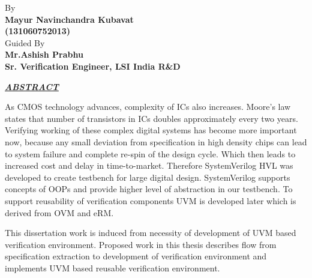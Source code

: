 \thispagestyle{plain}

\begin{center}
	\vspace{1cm}
		
		
	\vspace{1.5cm}
		
			\normalsize
			By\\
			\textbf{Mayur Navinchandra Kubavat}\\
			\textbf{(131060752013)} \\
			Guided By\\
			\textbf{Mr.Ashish Prabhu}\\
			\textbf{Sr. Verification Engineer, LSI India R\&D}
			
	\bigsize\textbf\textit\underline{ABSTRACT}
\end{center}

As CMOS technology advances, complexity of ICs also increases. Moore’s law states that number of transistors in ICs doubles approximately every two years. Verifying working of these complex digital systems has become more important now, because any small deviation from specification in high density chips can lead to system failure and complete re-spin of the design cycle. Which then leads to increased cost and delay in time-to-market. Therefore SystemVerilog HVL was developed to create testbench for large digital design. SystemVerilog supports concepts of OOPs and provide higher level of abstraction in our testbench. To support reusability of verification components UVM is developed later which is derived from OVM and eRM. \par

This dissertation work is induced from necessity of development of UVM based verification environment. Proposed work in this thesis describes flow from specification extraction to development of verification environment and implements UVM based reusable verification environment. \par
